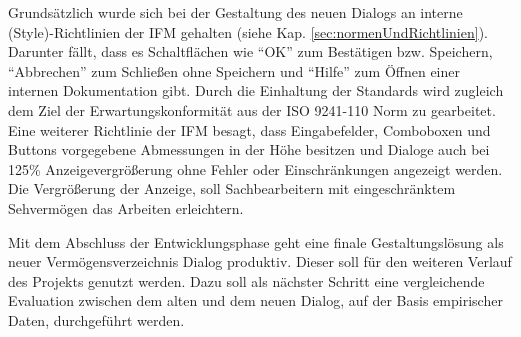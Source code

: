 Grundsätzlich wurde sich bei der Gestaltung des neuen Dialogs an interne (Style)-Richtlinien der IFM gehalten (siehe Kap. \ref{sec:normenUndRichtlinien}). Darunter fällt, dass es Schaltflächen wie \enquote{OK} zum Bestätigen bzw. Speichern, \enquote{Abbrechen} zum Schließen ohne Speichern und \enquote{Hilfe} zum Öffnen einer internen Dokumentation gibt. Durch die Einhaltung der Standards wird zugleich dem Ziel der Erwartungskonformität aus der ISO 9241-110 Norm  zu gearbeitet. Eine weiterer Richtlinie der IFM besagt, dass Eingabefelder, Comboboxen und Buttons vorgegebene Abmessungen in der Höhe besitzen und Dialoge auch bei 125\% Anzeigevergrößerung ohne Fehler oder Einschränkungen angezeigt werden. Die Vergrößerung der Anzeige, soll Sachbearbeitern mit eingeschränktem Sehvermögen das Arbeiten erleichtern.

Mit dem Abschluss der Entwicklungsphase geht eine finale Gestaltungslösung als neuer Vermögensverzeichnis Dialog produktiv. Dieser soll für den weiteren Verlauf des Projekts genutzt werden. Dazu soll als nächster Schritt eine vergleichende Evaluation zwischen dem alten und dem neuen Dialog, auf der Basis empirischer Daten, durchgeführt werden.



